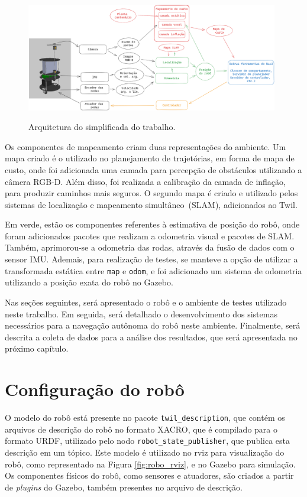 \documentclass[repeatfields,xlists,xpacks,oneside,yearsonly]{ufrgscca}
\begin{document}
\begin{figure}[h]
    {
        \centering
        \caption{Arquitetura do simplificada do trabalho.}
        \label{fig:arq_trabalho}
        \includegraphics[width=0.98\textwidth]{arquitetura_simplificadav3.png}\\
    }
\end{figure}

Os componentes de mapeamento criam duas representações do ambiente.
Um mapa criado é o utilizado no planejamento de trajetórias, em forma
de mapa de custo, onde foi adicionada uma camada para percepção de
obstáculos utilizando a câmera RGB-D. Além disso, foi realizada a
calibração da camada de inflação, para produzir caminhos mais
seguros. O segundo mapa é criado e utilizado pelos sistemas de
localização e mapeamento simultâneo~(SLAM), adicionados ao Twil.

Em verde, estão os componentes referentes à estimativa de posição do
robô, onde foram adicionados pacotes que realizam a odometria visual
e pacotes de SLAM. Também, aprimorou-se a odometria das rodas,
através da fusão de dados com o sensor IMU. Ademais, para realização
de testes, se manteve a opção de utilizar a transformada estática
entre \texttt{map} e \texttt{odom}, e foi adicionado um sistema de
odometria utilizando a posição exata do robô no Gazebo.

Nas seções seguintes, será apresentado o robô e o ambiente de testes
utilizado neste trabalho. Em seguida, será detalhado o
desenvolvimento dos sistemas necessários para a navegação autônoma do
robô neste ambiente. Finalmente, será descrita a coleta de dados para
a análise dos resultados, que será apresentada no próximo capítulo.

\section{Configuração do robô}

O modelo do robô está presente no pacote \texttt{twil\_description},
que contém os arquivos de descrição do robô no formato XACRO, que é
compilado para o formato URDF, utilizado pelo nodo
\texttt{robot\_state\_publisher}, que publica esta descrição em um
tópico. Este modelo é utilizado no rviz para visualização do robô,
como representado na Figura \ref{fig:robo_rviz}, e no Gazebo para
simulação. Os componentes físicos do robô, como sensores e atuadores,
são criados a partir de \textit{plugins} do Gazebo, também presentes
no arquivo de descrição.
\end{document}
